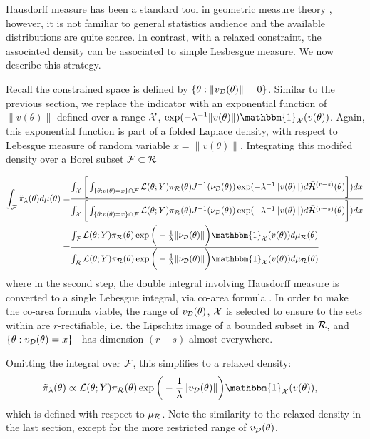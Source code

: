 \documentclass[10pt,fleqn]{article}
\DeclareMathOperator{\1}{\mathbbm{1}} \DeclareMathOperator{\bigO}{\mc O}
\begin{document}
Hausdorff measure has been a standard tool in geometric measure theory
\citep{federer2014geometric}, however, it is not familiar to general statistics audience and the available distributions are quite scarce. In contrast, with a relaxed constraint, the associated density can be associated to simple Lesbesgue measure. We now describe this strategy.

Recall the constrained space is defined by $\{\theta:\|v_{\mathcal{D}}(\theta)\|=0\}$. Similar to the previous section,  we replace the indicator with an exponential function of $\|v(\theta)\|$ defined over a range $\mathcal{X}$, $\exp(
-{\lambda^{-1}}\|v(\theta)\|) \mathbbm{1}_{\mc X}(v(\theta))$. 
Again, this exponential function is part of a folded Laplace density, with respect to Lebesgue measure of random variable $x=\|v(\theta)\|$. Integrating this modifed density over a Borel subset $\mathcal{F} \subset \mathcal{R}$

\begin{equation}
\begin{aligned}
\int_{\mc F} \tilde{\pi}_\lambda(\theta) d \mu(\theta)= & \frac{\int_{\mc X}
\bigg[ \int_{ \{\theta:v(\theta)=x\}\cap \mc F }
{\mathcal{L}(\theta;Y)\pi_\mathcal{R}(\theta)}{J^{-1}(\nu_\mathcal{D}(\theta))\exp(-{\lambda^{-1}}\|v(\theta)\|
)}
d\bar{\mathcal{H}}^{(r-s)}(\theta) \bigg] )dx
}
{\int_{\mc X}
\bigg[ \int_{ \{\theta:v(\theta)=x\}\cap \mc F }
{\mathcal{L}(\theta;Y)\pi_\mathcal{R}(\theta)}{J^{-1}(\nu_\mathcal{D}(\theta))\exp(-{\lambda^{-1}}\|v(\theta)\|
)}
d\bar{\mathcal{H}}^{(r-s)}(\theta) \bigg] )dx
} \\
= & \frac{\int_\mathcal{F} \mathcal{L}(\theta;Y)
\pi_\mathcal{R}(\theta)\exp\bigg(-\frac{1}{\lambda}\|\nu_\mathcal{D}(\theta)\|\bigg)
\mathbbm{1}_{\mc X}(v(\theta)) d\mu_\mathcal{R}(\theta)}
{\int_\mathcal{R} \mathcal{L}(\theta;Y)
\pi_\mathcal{R}(\theta)\exp\bigg(-\frac{1}{\lambda}\|\nu_\mathcal{D}(\theta)\|\bigg)
\mathbbm{1}_{\mc X}(v(\theta)) d\mu_\mathcal{R}(\theta)}
\end{aligned}
\end{equation}
where in the second step, the double integral involving Hausdorff measure is converted to a single Lebesgue integral, via  co-area formula \citep{federer2014geometric}.
In order to make the co-area formula viable, the range of $v_{\mathcal{D}}(\theta)$, $\mathcal{X}$ is selected to ensure to the sets within are $r$-rectifiable, i.e. the Lipschitz image of a bounded subset in $\mathcal{R}$, and $\{\theta:v_{\mathcal{D}}(\theta)=x\}$ \ has dimension $(r-s)$ almost everywhere.

Omitting the integral over
$\mathcal{F}$, this simplifies to a relaxed density:
\begin{equation}
\begin{split}
\label{EQ:relaxedDensityZeroMeasure}
\tilde{\pi}_\lambda(\theta)  & \propto \mathcal{L}(\theta;Y)
\pi_\mathcal{R}(\theta)\exp\bigg(-\frac{1}{\lambda}\|v_\mathcal{D}(\theta)\|\bigg)
\mathbbm{1}_{\mc X}(v(\theta)),
\end{split}
\end{equation}
which is defined with respect to $\mu_{\mathcal{R}}$. Note the similarity to the relaxed density in the last section, except for the more restricted range of  $v_{\mathcal{D}}(\theta)$.
\end{document}
